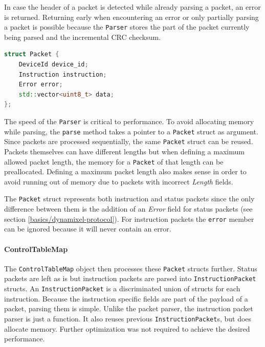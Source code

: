 In case the header of a packet is detected while already parsing a packet, an error is returned.
Returning early when encountering an error or only partially parsing a packet is possible because
the \lstinline{Parser} stores the part of the packet currently being parsed and the incremental
CRC checksum.

\begin{lstlisting}[language=C++, caption={Definition of the \lstinline{Packet} struct}]
struct Packet {
    DeviceId device_id;
    Instruction instruction;
    Error error;
    std::vector<uint8_t> data;
};
\end{lstlisting}

The speed of the \lstinline{Parser} is critical to performance. To avoid allocating memory while
parsing, the \lstinline{parse} method takes a pointer to a \lstinline{Packet} struct as argument.
Since packets are processed sequentially, the same \lstinline{Packet} struct can be reused. Packets
themselves can have different lengths but when defining a maximum allowed packet length, the memory
for a \lstinline{Packet} of that length can be preallocated. Defining a maximum packet length also
makes sense in order to avoid running out of memory due to packets with incorrect \textit{Length}
fields.

The \lstinline{Packet} struct represents both instruction and status packets since the only difference
between them is the addition of an \textit{Error} field for status packets (see section
\ref{basics/dynamixel-protocol}). For instruction packets the \lstinline{error} member can be ignored
because it will never contain an error.

\paragraph{ControlTableMap}

The \lstinline{ControlTableMap} object then processes these \lstinline{Packet} structs further.
Status packets are left as is but instruction packets are parsed into \lstinline{InstructionPacket}
structs. An \lstinline{InstructionPacket} is a discriminated union of structs for each instruction.
Because the instruction specific fields are part of the payload of a packet, parsing them is simple.
Unlike the packet parser, the instruction packet parser is just a function. It also reuses previous
\lstinline{InstructionPacket}s, but does allocate memory. Further optimization was not required to
achieve the desired performance.

